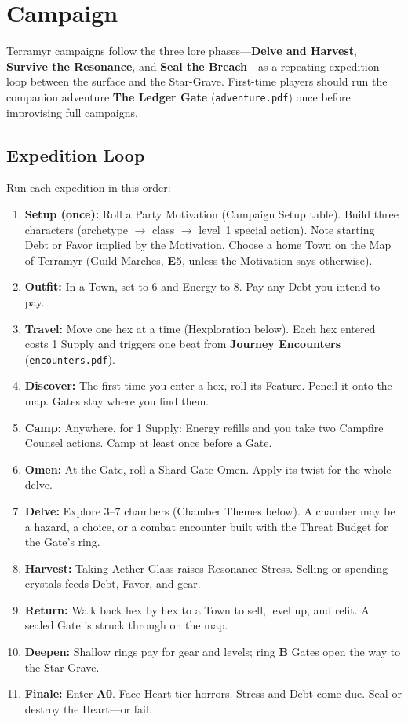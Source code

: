 \section{Campaign}

Terramyr campaigns follow the three lore phases---\textbf{Delve and Harvest}, \textbf{Survive the Resonance}, and \textbf{Seal the Breach}---as a repeating expedition loop between the surface and the Star-Grave.
First-time players should run the companion adventure \textbf{The Ledger Gate} (\texttt{adventure.pdf}) once before improvising full campaigns.

\subsection{Expedition Loop}

Run each expedition in this order:

\begin{enumerate}
    \item \textbf{Setup (once):} Roll a Party Motivation (Campaign Setup table). Build three characters (archetype $\rightarrow$ class $\rightarrow$ level~1 special action). Note starting Debt or Favor implied by the Motivation. Choose a home Town on the Map of Terramyr (Guild Marches, \textbf{E5}, unless the Motivation says otherwise).
    \item \textbf{Outfit:} In a Town, set  to 6 and Energy to 8. Pay any Debt you intend to pay.
    \item \textbf{Travel:} Move one hex at a time (Hexploration below). Each hex entered costs 1 Supply and triggers one beat from \textbf{Journey Encounters} (\texttt{encounters.pdf}).
    \item \textbf{Discover:} The first time you enter a hex, roll its Feature. Pencil it onto the map. Gates stay where you find them.
    \item \textbf{Camp:} Anywhere, for 1 Supply: Energy refills and you take two Campfire Counsel actions. Camp at least once before a Gate.
    \item \textbf{Omen:} At the Gate, roll a Shard-Gate Omen. Apply its twist for the whole delve.
    \item \textbf{Delve:} Explore 3--7 chambers (Chamber Themes below). A chamber may be a hazard, a choice, or a combat encounter built with the Threat Budget for the Gate's ring.
    \item \textbf{Harvest:} Taking Aether-Glass raises Resonance Stress. Selling or spending crystals feeds Debt, Favor, and gear.
    \item \textbf{Return:} Walk back hex by hex to a Town to sell, level up, and refit. A sealed Gate is struck through on the map.
    \item \textbf{Deepen:} Shallow rings pay for gear and levels; ring \textbf{B} Gates open the way to the Star-Grave.
    \item \textbf{Finale:} Enter \textbf{A0}. Face Heart-tier horrors. Stress and Debt come due. Seal or destroy the Heart---or fail.
\end{enumerate}

